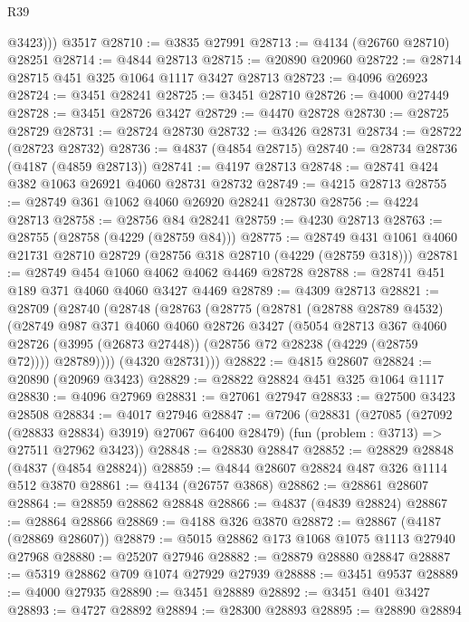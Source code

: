 \begin{lexlean}{R39}
\begin{coremodule}
          @3423)))
    @3517
@28710 := @3835 @27991
@28713 := @4134 (@26760 @28710) @28251
@28714 := @4844 @28713
@28715 := @20890 @20960
@28722 := @28714 @28715 @451 @325 @1064 @1117 @3427 @28713
@28723 := @4096 @26923
@28724 := @3451 @28241
@28725 := @3451 @28710
@28726 := @4000 @27449
@28728 := @3451 @28726 @3427
@28729 := @4470 @28728
@28730 := @28725 @28729
@28731 := @28724 @28730
@28732 := @3426 @28731
@28734 := @28722 (@28723 @28732)
@28736 := @4837 (@4854 @28715)
@28740 := @28734 @28736 (@4187 (@4859 @28713))
@28741 := @4197 @28713
@28748 := @28741 @424 @382 @1063 @26921 @4060 @28731 @28732
@28749 := @4215 @28713
@28755 := @28749 @361 @1062 @4060 @26920 @28241 @28730
@28756 := @4224 @28713
@28758 := @28756 @84 @28241
@28759 := @4230 @28713
@28763 := @28755 (@28758 (@4229 (@28759 @84)))
@28775 := @28749 @431 @1061 @4060 @21731 @28710 @28729 (@28756 @318 @28710 (@4229 (@28759 @318)))
@28781 := @28749 @454 @1060 @4062 @4062 @4469 @28728
@28788 := @28741 @451 @189 @371 @4060 @4060 @3427 @4469
@28789 := @4309 @28713
@28821 := @28709
    (@28740
      (@28748
        (@28763
          (@28775
            (@28781
              (@28788 @28789 @4532)
              (@28749
                @987
                @371
                @4060
                @4060
                @28726
                @3427
                (@5054
                  @28713
                  @367
                  @4060
                  @28726
                  (@3995 (@26873 @27448))
                  (@28756 @72 @28238 (@4229 (@28759 @72))))
                @28789))))
        (@4320 @28731)))
@28822 := @4815 @28607
@28824 := @20890 (@20969 @3423)
@28829 := @28822 @28824 @451 @325 @1064 @1117
@28830 := @4096 @27969
@28831 := @27061 @27947
@28833 := @27500 @3423 @28508
@28834 := @4017 @27946
@28847 := @7206
    (@28831
      (@27085 (@27092 (@28833 @28834) @3919) @27067 @6400 @28479)
      (fun (problem : @3713) => @27511 @27962 @3423))
@28848 := @28830 @28847
@28852 := @28829 @28848 (@4837 (@4854 @28824))
@28859 := @4844 @28607 @28824 @487 @326 @1114 @512 @3870
@28861 := @4134 (@26757 @3868)
@28862 := @28861 @28607
@28864 := @28859 @28862 @28848
@28866 := @4837 (@4839 @28824)
@28867 := @28864 @28866
@28869 := @4188 @326 @3870
@28872 := @28867 (@4187 (@28869 @28607))
@28879 := @5015 @28862 @173 @1068 @1075 @1113 @27940 @27968
@28880 := @25207 @27946
@28882 := @28879 @28880 @28847
@28887 := @5319 @28862 @709 @1074 @27929 @27939
@28888 := @3451 @9537
@28889 := @4000 @27935
@28890 := @3451 @28889
@28892 := @3451 @401 @3427
@28893 := @4727 @28892
@28894 := @28300 @28893
@28895 := @28890 @28894

\end{coremodule}
\end{lexlean}
